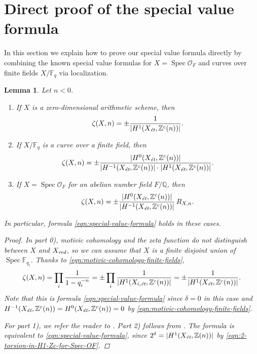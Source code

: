 \documentclass[draft]{article}
\DeclareMathOperator{\Spec}{Spec}
\newcommand{\FF}{\mathbb{F}}
\newcommand{\QQ}{\mathbb{Q}}
\newcommand{\ZZ}{\mathbb{Z}}
\newcommand{\et}{\text{\it \'{e}t}}
\newcommand{\red}{\text{\it red}}
\theoremstyle{myplain}
\newtheorem{lemma}[theorem]{Lemma}
\theoremstyle{mydefinition}
\begin{document}

\section{Direct proof of the special value formula}
\label{sec:direct-proof}

In this section we explain how to prove our special value formula directly by
combining the known special value formulas for $X = \Spec \mathcal{O}_F$ and
curves over finite fields $X/\FF_q$ via localization.

\begin{lemma}
  \label{lemma:elementary-proof-1}
  Let $n < 0$.

  \begin{enumerate}
  \item[0)] If $X$ is a zero-dimensional arithmetic scheme, then
    $$\zeta (X,n) = \pm \frac{1}{|H^1 (X_\et, \ZZ^c (n))|}.$$

  \item[1)] If $X/\FF_q$ is a curve over a finite field, then
    \[ \zeta (X,n) =
      \pm\frac{|H^0 (X_\et, \ZZ^c(n))|}{|H^{-1} (X_\et, \ZZ^c(n))|\cdot |H^1 (X_\et, \ZZ^c(n))|}. \]

  \item[2)] If $X = \Spec \mathcal{O}_F$ for an abelian number field $F/\QQ$,
    then
    \[ \zeta (X,n) = \pm\frac{|H^0 (X_\et, \ZZ^c(n))|}{|H^{-1} (X_\et, \ZZ^c(n))|}\,R_{X,n}. \]
  \end{enumerate}

  In particular, formula \eqref{eqn:special-value-formula} holds in these
  cases.

  \begin{proof}
    In part 0), motivic cohomology and the zeta function do not distinguish
    between $X$ and $X_\red$, so we can assume that $X$ is a finite   
    disjoint union of $\Spec \FF_{q_i}$. Thanks to
    \eqref{eqn:motivic-cohomology-finite-fields},
    \[ \zeta (X,n) = \prod_i \frac{1}{1 - q_i^{-n}} =
      \pm \prod_i \frac{1}{|H^1 (X_{i,\et}, \ZZ^c (n))|} =
      \pm \frac{1}{|H^1 (X_\et, \ZZ^c (n))|}. \]
    Note that this is formula \eqref{eqn:special-value-formula}
    since $\delta = 0$ in this case and
    $H^{-1} (X_\et, \ZZ^c (n)) = H^0 (X_\et, \ZZ^c (n)) = 0$ by
    \eqref{eqn:motivic-cohomology-finite-fields}.

    \vspace{1em}

    For part 1), we refer the reader to \cite[\S 5]{Beshenov-Weil-etale-2}.
    Part 2) follows from \cite[Proposition~5.35]{Flach-Morin-2018}.
    The formula is equivalent to \eqref{eqn:special-value-formula}, since
    $2^\delta = |H^1 (X_\et, \ZZ (n))|$ by
    \eqref{eqn:2-torsion-in-H1-Zc-for-Spec-OF}.
  \end{proof}
\end{lemma}
\end{document}
